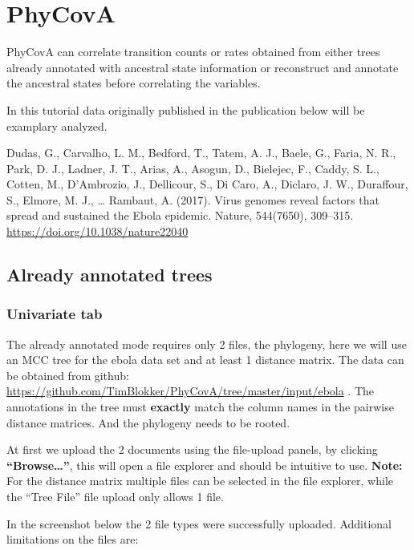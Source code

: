 \documentclass[
]{article}
\begin{document}
\hypertarget{phycova}{%
\section{PhyCovA}\label{phycova}}

PhyCovA can correlate transition counts or rates obtained from either
trees already annotated with ancestral state information or reconstruct
and annotate the ancestral states before correlating the variables.

In this tutorial data originally published in the publication below will
be examplary analyzed.

Dudas, G., Carvalho, L. M., Bedford, T., Tatem, A. J., Baele, G., Faria,
N. R., Park, D. J., Ladner, J. T., Arias, A., Asogun, D., Bielejec, F.,
Caddy, S. L., Cotten, M., D'Ambrozio, J., Dellicour, S., Di Caro, A.,
Diclaro, J. W., Duraffour, S., Elmore, M. J., \ldots{} Rambaut, A.
(2017). Virus genomes reveal factors that spread and sustained the Ebola
epidemic. Nature, 544(7650), 309--315.
\url{https://doi.org/10.1038/nature22040}

\hypertarget{already-annotated-trees}{%
\subsection{Already annotated trees}\label{already-annotated-trees}}

\hypertarget{univariate-tab}{%
\subsubsection{Univariate tab}\label{univariate-tab}}

The already annotated mode requires only 2 files, the phylogeny, here we
will use an MCC tree for the ebola data set and at least 1 distance
matrix. The data can be obtained from github:
\url{https://github.com/TimBlokker/PhyCovA/tree/master/input/ebola} .
The annotations in the tree must \textbf{exactly} match the column names
in the pairwise distance matrices. And the phylogeny needs to be rooted.

At first we upload the 2 documents using the file-upload panels, by
clicking \textbf{``Browse\ldots{}''}, this will open a file explorer and
should be intuitive to use. \textbf{Note:} For the distance matrix
multiple files can be selected in the file explorer, while the ``Tree
File'' file upload only allows 1 file.

In the screenshot below the 2 file types were successfully uploaded.
Additional limitations on the files are:
\end{document}

